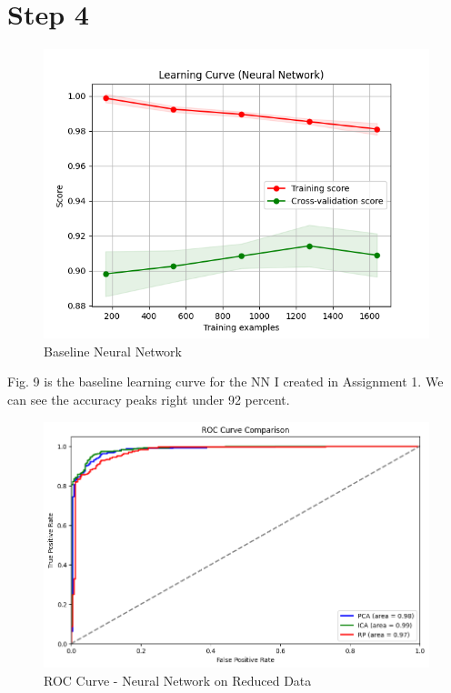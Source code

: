 \documentclass[conference]{IEEEtran}
\begin{document}
\section{Step 4}
\begin{figure}
    \centering
    \includegraphics[width=0.8\linewidth]{figures//housing_figures/baseline_learning_curve_nn.png}
    \caption{Baseline Neural Network}
    \label{fig:baseline}
\end{figure}
Fig. 9 is the baseline learning curve for the NN I created in Assignment 1. We can see the accuracy peaks right under 92 percent.
\begin{table}[htp]
    \centering
    \caption{Performance Metrics for PCA, ICA, and RP}
    \label{tab:performance_metrics}
    \resizebox{\columnwidth}{!}{%
    \begin{tabular}{lcccc}
    \toprule
    \textbf{Method} & \textbf{Accuracy} & \textbf{Training Time (s)} & \textbf{Prediction Time (s)} & \textbf{F1-Score Avg} \\
    \midrule
    \textbf{PCA} & 0.9334 & 3.4113 & 0.00041 & 0.93 \\
    \textbf{ICA} & 0.9471 & 2.6668 & 0.00051 & 0.95 \\
    \textbf{RP}  & 0.9181 & 2.1919 & 0.00032 & 0.92 \\
    \bottomrule
    \end{tabular}%
    }
\end{table}
\begin{figure}
        \centering
        \includegraphics[width=1\linewidth]{figures//housing_figures/ROC_curve_dim_reduction.png}
        \caption{ROC Curve - Neural Network on Reduced Data}
        \label{fig:enter-label}
    \end{figure}
\end{document}

